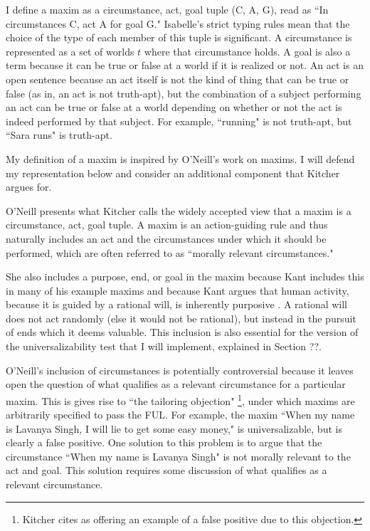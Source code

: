 \begin{isabellebody}
\begin{isamarkuptext}
I define a maxim as a circumstance, act, goal tuple (C, A, G), read 
as ``In circumstances C, act A for goal G." Isabelle's strict typing rules mean that the choice of the 
type of each member of this tuple is significant. A circumstance is represented as a set of worlds 
$t$ where that circumstance holds. A goal is also a term because it can be true or false at a world if it 
is realized or not. An act is an open sentence because an act itself is not the kind of thing that can 
be true or false (as in, an act is not truth-apt), but the combination of a subject performing an act 
can be true or false at a world depending on whether or not the act is indeed performed by that subject. 
For example, ``running" is not truth-apt, but ``Sara runs" is truth-apt.

My definition of a maxim is inspired by O'Neill's work on maxims. I will defend my representation
below and consider an additional component that Kitcher argues for.%
\end{isamarkuptext}\isamarkuptrue%
%
\isadelimdocument
%
\endisadelimdocument
%
\isatagdocument
%
\isamarkuptrue%
%
\endisatagdocument
{\isafolddocument}%
%
\isadelimdocument
%
\endisadelimdocument
%
\begin{isamarkuptext}%
O'Neill \cite[37]{actingonprinciple} presents what Kitcher \cite{whatisamaxim}  calls the widely accepted 
view that a maxim is a circumstance, act, goal tuple. A maxim 
is an action-guiding rule and thus naturally includes an act and the circumstances under which 
it should be performed, which are often referred to as ``morally relevant circumstances." 

She also includes a purpose, end, or goal in the maxim because Kant includes this in many of his 
example maxims and because Kant argues that human activity, because it is guided by a rational will, 
is inherently purposive \cite[4:428]{groundwork}. A rational will does not act randomly (else it would not be rational), 
but instead in the pursuit of ends which it deems valuable. This inclusion is also essential for the version of the universalizability test 
that I will implement, explained in Section ??.

O'Neill's inclusion of circumstances is potentially controversial because it leaves open the question of what qualifies as a 
relevant circumstance for a particular maxim. This is gives rise to ``the tailoring objection" \cite[217]{whatisamaxim} \footnote{Kitcher
cites \cite{kantsethicalthought}  as offering an example of a false positive due to this objection.}, 
under which maxims are arbitrarily specified to pass the FUL. For example, the maxim ``When my name is Lavanya Singh,
I will lie to get some easy money," is universalizable, but is clearly a false positive. One solution to 
this problem is to argue that the circumstance ``When my name is Lavanya Singh" is not morally relevant 
to the act and goal. This solution requires some discussion of what qualifies as a relevant circumstance.


\end{isamarkuptext}
\end{isabellebody}
